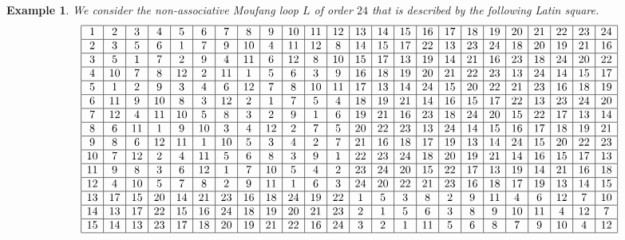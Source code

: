 \documentclass[11pt,a4paper]{article}
\newtheorem{example}[theorem]{Example}
\begin{document}
\begin{example}\label{example_subgroup} We consider the non-associative Moufang loop $L$ of order $24$ that is described by the following Latin square.
{\tiny \[\begin{array}{|c|c|c|c|c|c|c|c|c|c|c|c|c|c|c|c|c|c|c|c|c|c|c|c|}  \hline
1 & 2 & 3 & 4 & 5 & 6 & 7 & 8 & 9 & 10 & 11 & 12 & 13 & 14 & 15 & 16 & 17 & 18 & 19 & 20 & 21 & 22 & 23 & 24 \\ \hline
2 & 3 & 5 & 6 & 1 & 7 & 9 & 10 & 4 & 11 & 12 & 8 & 14 & 15 & 17 & 22 & 13 & 23 & 24 & 18 & 20 & 19 & 21 & 16 \\ \hline
3 & 5 & 1 & 7 & 2 & 9 & 4 & 11 & 6 & 12 & 8 & 10 & 15 & 17 & 13 & 19 & 14 & 21 & 16 & 23 & 18 & 24 & 20 & 22 \\ \hline
4 & 10 & 7 & 8 & 12 & 2 & 11 & 1 & 5 & 6 & 3 & 9 & 16 & 18 & 19 & 20 & 21 & 22 & 23 & 13 & 24 & 14 & 15 & 17 \\ \hline
5 & 1 & 2 & 9 & 3 & 4 & 6 & 12 & 7 & 8 & 10 & 11 & 17 & 13 & 14 & 24 & 15 & 20 & 22 & 21 & 23 & 16 & 18 & 19 \\ \hline
6 & 11 & 9 & 10 & 8 & 3 & 12 & 2 & 1 & 7 & 5 & 4 & 18 & 19 & 21 & 14 & 16 & 15 & 17 & 22 & 13 & 23 & 24 & 20 \\ \hline
7 & 12 & 4 & 11 & 10 & 5 & 8 & 3 & 2 & 9 & 1 & 6 & 19 & 21 & 16 & 23 & 18 & 24 & 20 & 15 & 22 & 17 & 13 & 14 \\ \hline
8 & 6 & 11 & 1 & 9 & 10 & 3 & 4 & 12 & 2 & 7 & 5 & 20 & 22 & 23 & 13 & 24 & 14 & 15 & 16 & 17 & 18 & 19 & 21 \\ \hline
9 & 8 & 6 & 12 & 11 & 1 & 10 & 5 & 3 & 4 & 2 & 7 & 21 & 16 & 18 & 17 & 19 & 13 & 14 & 24 & 15 & 20 & 22 & 23 \\ \hline
10 & 7 & 12 & 2 & 4 & 11 & 5 & 6 & 8 & 3 & 9 & 1 & 22 & 23 & 24 & 18 & 20 & 19 & 21 & 14 & 16 & 15 & 17 & 13 \\ \hline
11 & 9 & 8 & 3 & 6 & 12 & 1 & 7 & 10 & 5 & 4 & 2 & 23 & 24 & 20 & 15 & 22 & 17 & 13 & 19 & 14 & 21 & 16 & 18 \\ \hline
12 & 4 & 10 & 5 & 7 & 8 & 2 & 9 & 11 & 1 & 6 & 3 & 24 & 20 & 22 & 21 & 23 & 16 & 18 & 17 & 19 & 13 & 14 & 15 \\ \hline
13 & 17 & 15 & 20 & 14 & 21 & 23 & 16 & 18 & 24 & 19 & 22 & 1 & 5 & 3 & 8 & 2 & 9 & 11 & 4 & 6 & 12 & 7 & 10 \\ \hline
14 & 13 & 17 & 22 & 15 & 16 & 24 & 18 & 19 & 20 & 21 & 23 & 2 & 1 & 5 & 6 & 3 & 8 & 9 & 10 & 11 & 4 & 12 & 7 \\ \hline
15 & 14 & 13 & 23 & 17 & 18 & 20 & 19 & 21 & 22 & 16 & 24 & 3 & 2 & 1 & 11 & 5 & 6 & 8 & 7 & 9 & 10 & 4 & 12 \\ \hline

\end{array}\]}
\end{example}
\end{document}
